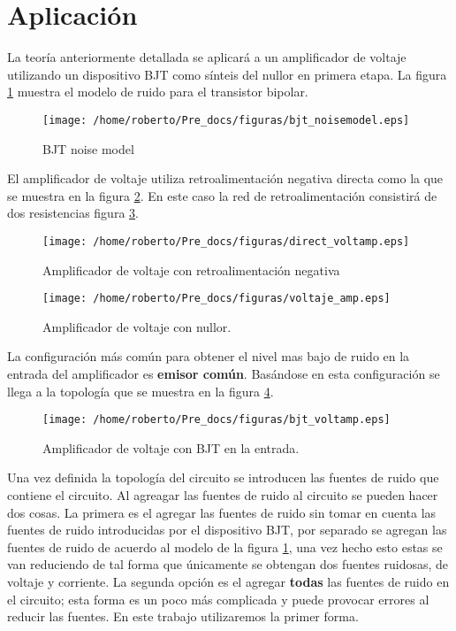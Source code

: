 \documentclass[letterpaper,10pt,twocolumn]{article}
\begin{document}
\section{Aplicaci\'on}
La teor\'ia anteriormente detallada se aplicar\'a a un amplificador de voltaje utilizando un dispositivo BJT como s\'inteis del nullor en primera etapa. La figura \ref{fig:noisebjt} muestra el modelo de ruido para el transistor bipolar.

\begin{figure}
   \centering
   \texttt{[image: /home/roberto/Pre\_docs/figuras/bjt\_noisemodel.eps]}
   \caption{BJT noise model}
   \label{fig:noisebjt}
\end{figure}

El amplificador de voltaje utiliza retroalimentaci\'on negativa directa como la que se muestra en la figura \ref{fig:voltamp}. En este caso la red de retroalimentaci\'on consistir\'a de dos resistencias figura \ref{fig:null_voltamp}.

\begin{figure}
   \centering
   \texttt{[image: /home/roberto/Pre\_docs/figuras/direct\_voltamp.eps]}
   \caption{Amplificador de voltaje con retroalimentaci\'on negativa}
   \label{fig:voltamp}
\end{figure}

\begin{figure}
   \centering
   \texttt{[image: /home/roberto/Pre\_docs/figuras/voltaje\_amp.eps]}
   \caption{Amplificador de voltaje con nullor.}
   \label{fig:null_voltamp}
\end{figure}

La configuraci\'on m\'as com\'un para obtener el nivel mas bajo de ruido en la entrada del amplificador es {\bf emisor com\'un}. Bas\'andose en esta configuraci\'on se llega a la topolog\'ia que se muestra en la figura \ref{fig:bjt_voltamp}.

\begin{figure}
   \centering
   \texttt{[image: /home/roberto/Pre\_docs/figuras/bjt\_voltamp.eps]}
   \caption{Amplificador de voltaje con BJT en la entrada.}
   \label{fig:bjt_voltamp}
\end{figure}

Una vez definida la topolog\'ia del circuito se introducen las fuentes de ruido que contiene el circuito. Al agreagar las fuentes de ruido al circuito se pueden hacer dos cosas. La primera es el agregar las fuentes de ruido sin tomar en cuenta las fuentes de ruido introducidas por el dispositivo BJT, por separado se agregan las fuentes de ruido de acuerdo al modelo de la figura \ref{fig:noisebjt}, una vez hecho esto estas se van reduciendo de tal forma que \'unicamente se obtengan dos fuentes ruidosas, de voltaje y corriente. La segunda opci\'on es el agregar {\bf todas} las fuentes de ruido en el circuito; esta forma es un poco m\'as complicada y puede provocar errores al reducir las fuentes. En este trabajo utilizaremos la primer forma.
\end{document}
